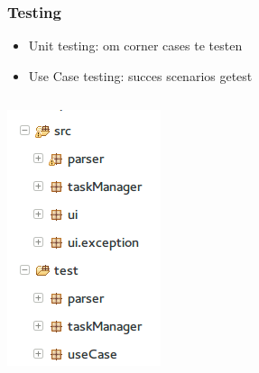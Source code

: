 \documentclass{beamer}
\begin{document}
\begin{frame}
\frametitle {Testing}
\begin{itemize}
    \item Unit testing: om corner cases te testen
    \item Use Case testing: succes scenarios getest
\end{itemize}
\begin{columns}
    \begin{column}{.4\paperwidth}
        \includegraphics[width=0.25\paperwidth]{figures/Package_overview_eclipse.png}
    \end{column}
    \begin{column}{.5\paperwidth}
   
    \end{column}
\end{columns}
\end{frame}
\end{document}

